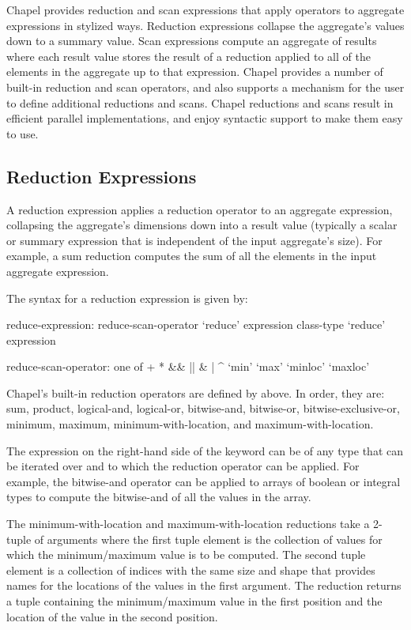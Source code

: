 \label{Reductions_and_Scans}

Chapel provides reduction and scan expressions that apply operators to
aggregate expressions in stylized ways.  Reduction expressions
collapse the aggregate's values down to a summary value.  Scan
expressions compute an aggregate of results where each result value
stores the result of a reduction applied to all of the elements in the
aggregate up to that expression.  Chapel provides a number of built-in
reduction and scan operators, and also supports a mechanism for the
user to define additional reductions and scans.  Chapel reductions and
scans result in efficient parallel implementations, and enjoy
syntactic support to make them easy to use.


\subsection{Reduction Expressions}
\label{reduce}

A reduction expression applies a reduction operator to an aggregate
expression, collapsing the aggregate's dimensions down into a result
value (typically a scalar or summary expression that is independent of
the input aggregate's size).  For example, a sum reduction computes
the sum of all the elements in the input aggregate expression.

The syntax for a reduction expression is given by:
\begin{syntax}
reduce-expression:
  reduce-scan-operator `reduce' expression
  class-type `reduce' expression

reduce-scan-operator: one of
  + * && || & | ^ `min' `max' `minloc' `maxloc'
\end{syntax}

Chapel's built-in reduction operators are defined
by  above.  In order, they are: sum,
product, logical-and, logical-or, bitwise-and, bitwise-or,
bitwise-exclusive-or, minimum, maximum, minimum-with-location, and
maximum-with-location.

The expression on the right-hand side of the  keyword
can be of any type that can be iterated over and to which the
reduction operator can be applied.  For example, the bitwise-and
operator can be applied to arrays of boolean or integral types to
compute the bitwise-and of all the values in the array.

The minimum-with-location and maximum-with-location reductions take a
2-tuple of arguments where the first tuple element is the collection
of values for which the minimum/maximum value is to be computed.  The
second tuple element is a collection of indices with the same size and
shape that provides names for the locations of the values in the first
argument.  The reduction returns a tuple containing the
minimum/maximum value in the first position and the location of the
value in the second position.


